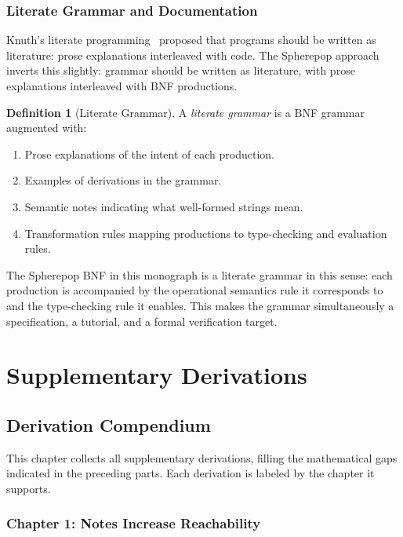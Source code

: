 \documentclass[12pt, a4paper, openany]{book}
\theoremstyle{plain}
\theoremstyle{definition}
\newtheorem{definition}[theorem]{Definition}
\theoremstyle{remark}
\begin{document}
\section{Literate Grammar and Documentation}

Knuth's literate programming~\cite{knuth84} proposed that programs should be
written as literature: prose explanations interleaved with code. The Spherepop
approach inverts this slightly: grammar should be written as literature, with
prose explanations interleaved with BNF productions.

\begin{definition}[Literate Grammar]
A \emph{literate grammar} is a BNF grammar augmented with:
\begin{enumerate}
\item Prose explanations of the intent of each production.
\item Examples of derivations in the grammar.
\item Semantic notes indicating what well-formed strings mean.
\item Transformation rules mapping productions to type-checking and evaluation rules.
\end{enumerate}
\end{definition}

The Spherepop BNF in this monograph is a literate grammar in this sense: each
production is accompanied by the operational semantics rule it corresponds to
and the type-checking rule it enables. This makes the grammar simultaneously
a specification, a tutorial, and a formal verification target.

\part{Supplementary Derivations}

\chapter{Derivation Compendium}

This chapter collects all supplementary derivations, filling the mathematical
gaps indicated in the preceding parts. Each derivation is labeled by the chapter
it supports.

\section{Chapter 1: Notes Increase Reachability}
\end{document}
